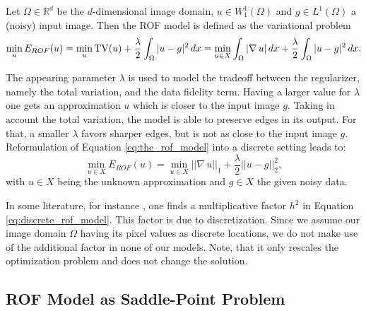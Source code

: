     \begin{definition} %
    \label{def:the_rof_model}

        Let $\Omega \in \mathbb{R}^{d}$ be the $d$-dimensional image domain, $u \in W_{1}^{1}(\Omega)$ and $g \in L^{1}(\Omega)$ a (noisy) input image. Then the ROF model is defined as the variational problem
            \begin{equation}
                \min_{u} E_{ROF}(u) = \min_{u} \textnormal{TV}(u) + \frac{\lambda}{2} \int_{\Omega} |u - g|^{2} \, dx = \min_{u \in X} \int_{\Omega} |\nabla \, u| \, dx + \frac{\lambda}{2} \int_{\Omega} |u - g|^{2} \, dx.
                \label{eq:the_rof_model}
            \end{equation}

    \end{definition}

    The appearing parameter $\lambda$ is used to model the tradeoff between the regularizer, namely the total variation, and the data fidelity term. Having a larger value for $\lambda$ one gets an approximation $u$ which is closer to the input image $g$. Taking in account the total variation, the model is able to preserve edges in its output. For that, a smaller $\lambda$ favors sharper edges, but is not as close to the input image $g$. Reformulation of Equation \ref{eq:the_rof_model} into a discrete setting leads to:
        \begin{equation}
            \min_{u \in X} E_{ROF}(u) = \min_{u \in X} ||\nabla \, u||_{1} + \frac{\lambda}{2} ||u - g||_{2}^{2},
        \label{eq:discrete_rof_model}
        \end{equation}
    with $u \in X$ being the unknown approximation and $g \in X$ the given noisy data.

    \begin{remark} %
        In some literature, for instance \cite{Chambolle10afirst-order}, one finds a multiplicative factor $h^{2}$ in Equation \ref{eq:discrete_rof_model}. This factor is due to discretization. Since we assume our image domain $\Omega$ having its pixel values as discrete locations, we do not make use of the additional factor in none of our models. Note, that it only rescales the optimization problem and does not change the solution.
    \end{remark}

    \subsection{ROF Model as Saddle-Point Problem} %
    \label{sub:rof_model_as_saddle_point_problem}

